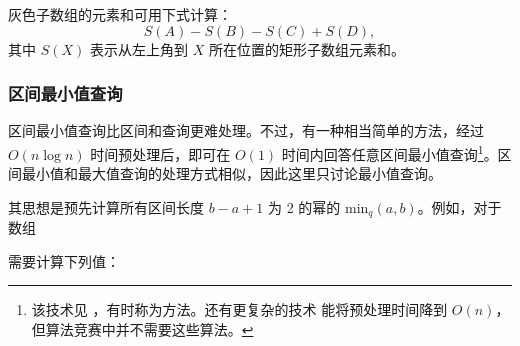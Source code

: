灰色子数组的元素和可用下式计算：
\[S(A) - S(B) - S(C) + S(D),\]
其中 $S(X)$ 表示从左上角到 $X$ 所在位置的矩形子数组元素和。

\subsubsection{区间最小值查询}


区间最小值查询比区间和查询更难处理。不过，有一种相当简单的方法，经过 $O(n\log n)$ 时间预处理后，即可在 $O(1)$ 时间内回答任意区间最小值查询\footnote{该技术见 \cite{ben00}，有时称为方法。还有更复杂的技术 \cite{fis06} 能将预处理时间降到 $O(n)$，但算法竞赛中并不需要这些算法。}。区间最小值和最大值查询的处理方式相似，因此这里只讨论最小值查询。

其思想是预先计算所有区间长度 $b-a+1$ 为 2 的幂的 $\textrm{min}_q(a,b)$。例如，对于数组

\begin{center}
\end{center}
需要计算下列值：

